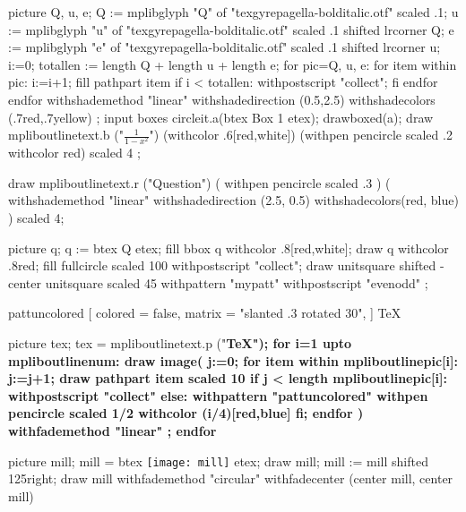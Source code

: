 \documentclass{article}
\begin{document}
\leavevmode
\mpfig
picture Q, u, e;
Q := mplibglyph "Q" of "texgyrepagella-bolditalic.otf" scaled .1;
u := mplibglyph "u" of "texgyrepagella-bolditalic.otf" scaled .1 shifted lrcorner Q;
e := mplibglyph "e" of "texgyrepagella-bolditalic.otf" scaled .1 shifted lrcorner u;
i:=0;
totallen := length Q + length u + length e;
for pic=Q, u, e:
  for item within pic:
    i:=i+1;
    fill pathpart item
    if i < totallen: withpostscript "collect"; fi
  endfor
endfor
  withshademethod "linear"
  withshadedirection (0.5,2.5)
  withshadecolors (.7red,.7yellow)
  ;
\endmpfig
{}%
\mpfig* input boxes \endmpfig
\mpfig circleit.a(btex Box 1 etex); drawboxed(a); \endmpfig
\def\mpfiginstancename{mympfig}%
\mpfig
draw mpliboutlinetext.b ("$\displaystyle\frac{1}{1-x^2}$")
    (withcolor .6[red,white])
    (withpen pencircle scaled .2 withcolor red)
    scaled 4 ;
\endmpfig
\par
\mpfig
  draw mpliboutlinetext.r
    ("Question")
    ( withpen pencircle scaled .3 )
    (
      withshademethod "linear"
      withshadedirection (2.5, 0.5)
      withshadecolors(red, blue)
    )
    scaled 4;
\endmpfig
\par\leavevmode
{}
  \mpfig
    picture q;
    q := btex Q etex;
    fill bbox q withcolor .8[red,white];
    draw q withcolor .8red;
  \endmpfig
\endmppattern
\mpfig
  fill fullcircle scaled 100 withpostscript "collect";
  draw unitsquare shifted - center unitsquare scaled 45
    withpattern "mypatt"
    withpostscript "evenodd"
    ;
\endmpfig
\begin{mppattern}{pattuncolored}
  [
    colored = false,
    matrix = "slanted .3 rotated 30",
  ]
  \tiny\TeX
\end{mppattern}\relax
\mpfig
  picture tex;
  tex = mpliboutlinetext.p ("\bfseries \TeX");
  for i=1 upto mpliboutlinenum:
    draw image(
    j:=0;
    for item within mpliboutlinepic[i]:
      j:=j+1;
      draw pathpart item scaled 10
      if j < length mpliboutlinepic[i]:
          withpostscript "collect"
      else:
          withpattern "pattuncolored"
          withpen pencircle scaled 1/2
          withcolor (i/4)[red,blue]
      fi;
    endfor
    )
    withfademethod "linear"
    ;
  endfor
\endmpfig
\par\leavevmode
\mpfig
  picture mill; mill = btex \texttt{[image: mill]} etex;
  draw mill;
  mill := mill shifted 125right;
  draw mill
    withfademethod "circular"
    withfadecenter (center mill, center mill)
\end{document}
